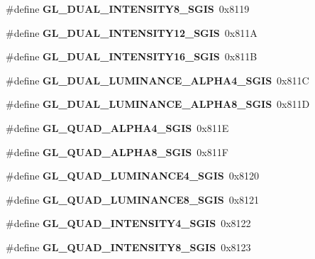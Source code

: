 \begin{DoxyCompactItemize}
\item 
\#define {\bfseries G\+L\+\_\+\+D\+U\+A\+L\+\_\+\+I\+N\+T\+E\+N\+S\+I\+T\+Y8\+\_\+\+S\+G\+I\+S}~0x8119\label{_s_d_l__opengl_8h_ae5bb423660152718c8600b2ffd2f213b}

\item 
\#define {\bfseries G\+L\+\_\+\+D\+U\+A\+L\+\_\+\+I\+N\+T\+E\+N\+S\+I\+T\+Y12\+\_\+\+S\+G\+I\+S}~0x811\+A\label{_s_d_l__opengl_8h_af96d55f87d0bb4bffc399125fe360c07}

\item 
\#define {\bfseries G\+L\+\_\+\+D\+U\+A\+L\+\_\+\+I\+N\+T\+E\+N\+S\+I\+T\+Y16\+\_\+\+S\+G\+I\+S}~0x811\+B\label{_s_d_l__opengl_8h_a50ef7fe948c2727b48420f8d7a9b3390}

\item 
\#define {\bfseries G\+L\+\_\+\+D\+U\+A\+L\+\_\+\+L\+U\+M\+I\+N\+A\+N\+C\+E\+\_\+\+A\+L\+P\+H\+A4\+\_\+\+S\+G\+I\+S}~0x811\+C\label{_s_d_l__opengl_8h_ae4af93aebf552f3115c01f3e98c61a60}

\item 
\#define {\bfseries G\+L\+\_\+\+D\+U\+A\+L\+\_\+\+L\+U\+M\+I\+N\+A\+N\+C\+E\+\_\+\+A\+L\+P\+H\+A8\+\_\+\+S\+G\+I\+S}~0x811\+D\label{_s_d_l__opengl_8h_aa69c0dd7c0e815bace817c8cceeb655a}

\item 
\#define {\bfseries G\+L\+\_\+\+Q\+U\+A\+D\+\_\+\+A\+L\+P\+H\+A4\+\_\+\+S\+G\+I\+S}~0x811\+E\label{_s_d_l__opengl_8h_ab228fbe51cc71bf9955341857a4d4886}

\item 
\#define {\bfseries G\+L\+\_\+\+Q\+U\+A\+D\+\_\+\+A\+L\+P\+H\+A8\+\_\+\+S\+G\+I\+S}~0x811\+F\label{_s_d_l__opengl_8h_ab9e996de1c73e73fa4eaf55d2b302ca3}

\item 
\#define {\bfseries G\+L\+\_\+\+Q\+U\+A\+D\+\_\+\+L\+U\+M\+I\+N\+A\+N\+C\+E4\+\_\+\+S\+G\+I\+S}~0x8120\label{_s_d_l__opengl_8h_add5b8be3177d7c3881b5baf571212ebb}

\item 
\#define {\bfseries G\+L\+\_\+\+Q\+U\+A\+D\+\_\+\+L\+U\+M\+I\+N\+A\+N\+C\+E8\+\_\+\+S\+G\+I\+S}~0x8121\label{_s_d_l__opengl_8h_a251a281b9469184f436bfbc2832dc4da}

\item 
\#define {\bfseries G\+L\+\_\+\+Q\+U\+A\+D\+\_\+\+I\+N\+T\+E\+N\+S\+I\+T\+Y4\+\_\+\+S\+G\+I\+S}~0x8122\label{_s_d_l__opengl_8h_aa2aca4ccb48a25faec12bba8d76d4943}

\item 
\#define {\bfseries G\+L\+\_\+\+Q\+U\+A\+D\+\_\+\+I\+N\+T\+E\+N\+S\+I\+T\+Y8\+\_\+\+S\+G\+I\+S}~0x8123\label{_s_d_l__opengl_8h_adf605dd32fba377eeea3a69dc97ebb14}


\end{DoxyCompactItemize}
